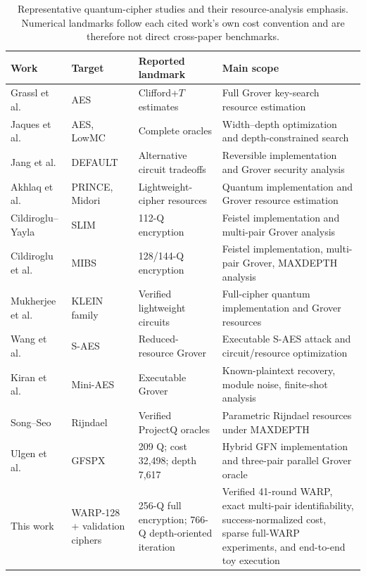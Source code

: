 \documentclass[10pt,a4paper]{article}
\begin{document}
\begin{table}[H]
\centering
\caption{Representative quantum-cipher studies and their resource-analysis emphasis. Numerical landmarks follow each cited work's own cost convention and are therefore not direct cross-paper benchmarks.}
\label{tab:related_comparison}
\scriptsize
\setlength{\tabcolsep}{4pt}
\begin{tabularx}{\textwidth}{@{}L{2.25cm}L{1.95cm}L{3.05cm}X@{}}
\toprule
Work & Target & Reported landmark & Main scope\\
\midrule
Grassl et al.~\cite{Grassl2016} & AES & Clifford+$T$ estimates & Full Grover key-search resource estimation\\
Jaques et al.~\cite{Jaques2020} & AES, LowMC & Complete oracles & Width--depth optimization and depth-constrained search\\
Jang et al.~\cite{JangDefault2025} & DEFAULT & Alternative circuit tradeoffs & Reversible implementation and Grover security analysis\\
Akhlaq et al.~\cite{Akhlaq2024} & PRINCE, Midori & Lightweight-cipher resources & Quantum implementation and Grover resource estimation\\
Cildiroglu--Yayla~\cite{SLIM2025} & SLIM & 112-Q encryption & Feistel implementation and multi-pair Grover analysis\\
Cildiroglu et al.~\cite{MIBS2026} & MIBS & 128/144-Q encryption & Feistel implementation, multi-pair Grover, MAXDEPTH analysis\\
Mukherjee et al.~\cite{KLEIN2026} & KLEIN family & Verified lightweight circuits & Full-cipher quantum implementation and Grover resources\\
Wang et al.~\cite{Wang2025} & S-AES & Reduced-resource Grover & Executable S-AES attack and circuit/resource optimization\\
Kiran et al.~\cite{Kiran2026} & Mini-AES & Executable Grover & Known-plaintext recovery, module noise, finite-shot analysis\\
Song--Seo~\cite{SongSeo2026} & Rijndael & Verified ProjectQ oracles & Parametric Rijndael resources under MAXDEPTH\\
Ulgen et al.~\cite{Ulgen2026} & GFSPX & 209 Q; cost 32,498; depth 7,617 & Hybrid GFN implementation and three-pair parallel Grover oracle\\
This work & WARP-128 + validation ciphers & 256-Q full encryption; 766-Q depth-oriented iteration & Verified 41-round WARP, exact multi-pair identifiability, success-normalized cost, sparse full-WARP experiments, and end-to-end toy execution\\
\bottomrule
\end{tabularx}
\end{table}
\end{document}
